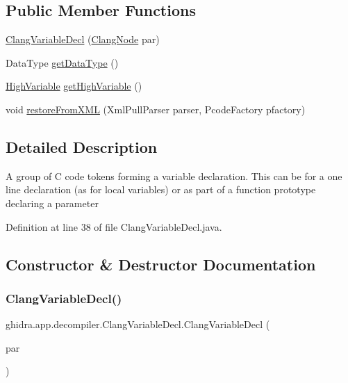 \subsection*{Public Member Functions}
\begin{DoxyCompactItemize}
\item 
\mbox{\hyperlink{classghidra_1_1app_1_1decompiler_1_1_clang_variable_decl_aa4dbc28ae395ec8016bb0b7992bcaacc}{Clang\+Variable\+Decl}} (\mbox{\hyperlink{interfaceghidra_1_1app_1_1decompiler_1_1_clang_node}{Clang\+Node}} par)
\item 
Data\+Type \mbox{\hyperlink{classghidra_1_1app_1_1decompiler_1_1_clang_variable_decl_aa2f08930c88dd4197f2c38a4b9bbf7c1}{get\+Data\+Type}} ()
\item 
\mbox{\hyperlink{class_high_variable}{High\+Variable}} \mbox{\hyperlink{classghidra_1_1app_1_1decompiler_1_1_clang_variable_decl_ab8eafa163c2ea2195fd3ab7974085e08}{get\+High\+Variable}} ()
\item 
void \mbox{\hyperlink{classghidra_1_1app_1_1decompiler_1_1_clang_variable_decl_a1da13d977c2e37bd4257752bb9819c96}{restore\+From\+X\+ML}} (Xml\+Pull\+Parser parser, Pcode\+Factory pfactory)
\end{DoxyCompactItemize}


\subsection{Detailed Description}
A group of C code tokens forming a variable declaration. This can be for a one line declaration (as for local variables) or as part of a function prototype declaring a parameter 

Definition at line 38 of file Clang\+Variable\+Decl.\+java.



\subsection{Constructor \& Destructor Documentation}
\mbox{\label{classghidra_1_1app_1_1decompiler_1_1_clang_variable_decl_aa4dbc28ae395ec8016bb0b7992bcaacc}} 
\subsubsection{\texorpdfstring{ClangVariableDecl()}{ClangVariableDecl()}}
{\footnotesize\ttfamily ghidra.\+app.\+decompiler.\+Clang\+Variable\+Decl.\+Clang\+Variable\+Decl (\begin{DoxyParamCaption}\item[{\mbox{\hyperlink{interfaceghidra_1_1app_1_1decompiler_1_1_clang_node}{Clang\+Node}}}]{par }\end{DoxyParamCaption})\hspace{0.3cm}{\ttfamily [inline]}}



